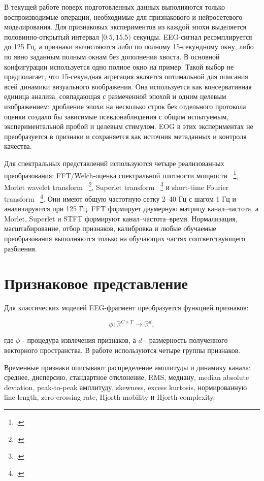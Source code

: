 В текущей работе поверх подготовленных данных выполняются только
воспроизводимые операции, необходимые для признакового и нейросетевого
моделирования. Для признаковых экспериментов из каждой эпохи выделяется
половинно-открытый интервал $[0.5, 15.5)$ секунды. EEG-сигнал ресэмплируется
до 125 Гц, а
признаки вычисляются либо по полному 15-секундному окну, либо по явно
заданным полным окнам без дополнения хвоста. В основной конфигурации
используется одно полное окно на пример. Такой выбор не предполагает, что
15-секундная агрегация является оптимальной для описания всей динамики
визуального воображения. Она используется как консервативная единица анализа,
совпадающая с размеченной эпохой и одним целевым изображением: дробление
эпохи на несколько строк без отдельного протокола оценки создало бы зависимые
псевдонаблюдения с общим испытуемым, экспериментальной пробой и целевым
стимулом. EOG в этих
экспериментах не преобразуется в признаки и сохраняется как источник
метаданных и контроля качества.

Для спектральных представлений используются четыре реализованных
преобразования: FFT/Welch-оценка спектральной плотности мощности
~\footcite{10.1109/TAU.1967.1161901}, Morlet wavelet transform
~\footcite{10.1137/0515056}, Superlet transform
~\footcite{10.1038/s41467-020-20539-9} и short-time Fourier transform
~\footcite{gabor1946theory}. Они имеют общую частотную сетку 2--40 Гц с шагом
1 Гц и анализируются при 125 Гц. FFT формирует двумерную матрицу
канал--частота, а Morlet, Superlet и STFT формируют канал--частота--время.
Нормализация, масштабирование, отбор признаков, калибровка и любые обучаемые
преобразования выполняются только на обучающих частях соответствующего
разбиения.

\section{Признаковое представление}

Для классических моделей EEG-фрагмент преобразуется функцией признаков:

$$
\phi: \mathbb{R}^{C \times T} \rightarrow \mathbb{R}^{d},
$$

где $\phi$ - процедура извлечения признаков, а $d$ - размерность полученного
векторного пространства. В работе используются четыре группы признаков.

Временные признаки описывают распределение амплитуды и динамику канала:
среднее, дисперсию, стандартное отклонение, RMS, медиану, median absolute
deviation, peak-to-peak амплитуду, skewness, excess kurtosis, нормированную
line length, zero-crossing rate, Hjorth mobility и Hjorth \newline complexity.

